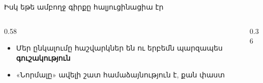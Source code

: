 \begin{frame}{Իսկ եթե ամբողջ գիրքը հալյուցինացիա էր}
  \begin{columns}[c]
    \begin{column}{0.58\textwidth}
      \begin{itemize}
        \item Մեր ընկալումը հաշվարկներ են ու երբեմն պարզապես \textbf{գուշակություն}
        \item «Նորմալը» ավելի շատ համաձայնություն է, քան փաստ
      \end{itemize}
    \end{column}
    \begin{column}{0.36\textwidth}
      \centering{}
    \end{column}
  \end{columns}
\end{frame}
